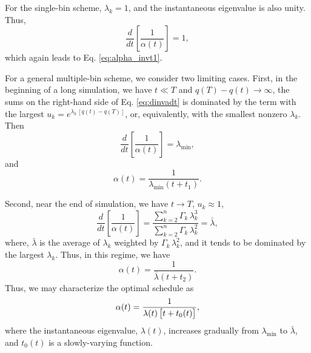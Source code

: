 \documentclass[reprint, floatfix]{revtex4-1}
\begin{document}
For the single-bin scheme, $\lambda_k = 1$,
and the instantaneous eigenvalue is also unity.
Thus,
$$
\frac { d   }
      { d t }
\left[
  \frac{      1    }
	   { \alpha(t) }
\right]
=
1,
$$
which again leads to Eq. \eqref{eq:alpha_invt1}.


For a general multiple-bin scheme,
we consider two limiting cases.
%
First, in the beginning of a long simulation,
we have $t \ll T$ and $q(T) - q(t) \to \infty$,
the sums on the right-hand side of Eq. \eqref{eq:dinvadt}
is dominated by the term with the largest
$u_k = e^{ \lambda_k \, [q(t) - q(T)] }$,
or, equivalently, with the smallest nonzero
$\lambda_k$.
Then
\begin{equation}
  \frac{ d   }
       { d t }
  \left[
    \frac{       1     }
         { \alpha( t ) }
  \right]
  =
  \lambda_{ \min }
  ,
  \label{eq:dinvadt_limit1}
\end{equation}
%
and
%
\begin{equation}
  \alpha( t )
  =
  \frac{               1               }
       { \lambda_{ \min } ( t + t_1 )  }
  .
  \label{eq:alpha_limit1}
\end{equation}
%


Second, near the end of simulation,
we have $t \to T$, $u_k \approx 1$,
%
\begin{equation}
  \frac{ d   }
       { d t }
  \left[
    \frac{       1     }
         { \alpha( t ) }
  \right]
  =
  \frac{
    \sum_{ k = 2 }^n
      \Gamma_k \, \lambda_k^3
  }
  {
    \sum_{ k = 2 }^n
      \Gamma_k \, \lambda_k^2
  }
  =
  \bar \lambda,
  \label{eq:dinvadt_limit2}
\end{equation}
%
where,
$\bar \lambda$
is the average of $\lambda_k$ weighted
by $\Gamma_k \, \lambda_k^2$,
and it tends to be dominated
by the largest $\lambda_k$.
%
Thus, in this regime, we have
%
\begin{equation}
  \alpha( t )
  =
  \frac{             1             }
       { \bar \lambda ( t + t_2 )  }
  .
  \label{eq:alpha_limit2}
\end{equation}
%
Thus, we may characterize the optimal schedule as
%
\begin{equation}
  \alpha(t)
  =
  \frac{                  1                     }
       { \lambda(t) \, \bigl[ t + t_0(t) \bigr] }
,
\notag
\end{equation}
%
where the instantaneous eigenvalue, $\lambda(t)$,
increases gradually from $\lambda_{\min}$ to $\bar \lambda$,
and $t_0(t)$ is a slowly-varying function.
\end{document}
